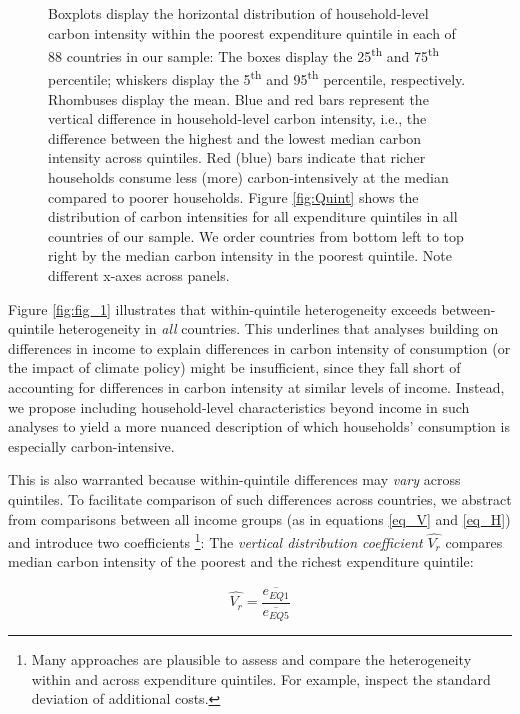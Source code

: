 \documentclass[12pt, a4paper]{article}
\newenvironment{subcaption2}
{\strut
\vspace{-5pt}
\begin{minipage}[b]{0.95\textwidth}
  \hspace*{-\parindent}
  \footnotesize}
 {\end{minipage}}
\begin{document}
\begin{figure}[ht!]
\begin{subcaption2}
    Boxplots display the horizontal distribution of household-level carbon intensity within the poorest expenditure quintile in each of 88 countries in our sample: The boxes display the 25\textsuperscript{th} and 75\textsuperscript{th} percentile; whiskers display the 5\textsuperscript{th} and 95\textsuperscript{th} percentile, respectively. Rhombuses display the mean. Blue and red bars represent the vertical difference in household-level carbon intensity, i.e., the difference between the highest and the lowest median carbon intensity across quintiles. Red (blue) bars indicate that richer households consume less (more) carbon-intensively at the median compared to poorer households. Figure \ref{fig:Quint} shows the distribution of carbon intensities for all expenditure quintiles in all countries of our sample. We order countries from bottom left to top right by the median carbon intensity in the poorest quintile. Note different x-axes across panels.
    \end{subcaption2}
\end{figure}

Figure \ref{fig:fig_1} illustrates that within-quintile heterogeneity exceeds between-quintile heterogeneity in \textit{all} countries. This underlines that analyses building on differences in income to explain differences in carbon intensity of consumption (or the impact of climate policy) might be insufficient, since they fall short of accounting for differences in carbon intensity at similar levels of income. Instead, we propose including household-level characteristics beyond income in such analyses to yield a more nuanced description of which households' consumption is especially carbon-intensive.

This is also warranted because within-quintile differences may \textit{vary} across quintiles. To facilitate comparison of such differences across countries, we abstract from comparisons between all income groups (as in equations \ref{eq_V} and \ref{eq_H}) and introduce two coefficients \autocite{Missbach.2024}\footnote{Many approaches are plausible to assess and compare the heterogeneity within and across expenditure quintiles. For example, \textcite{Cronin.2019} inspect the standard deviation of additional costs.}: The \textit{vertical distribution coefficient} $\widehat{V_{r}}$ compares median carbon intensity of the poorest and the richest expenditure quintile:

\begin{equation}
    \widehat{V_{r}} = \frac{\overline{e_{EQ1}}}{\overline{e_{EQ5}}}
\end{equation}
\end{document}
